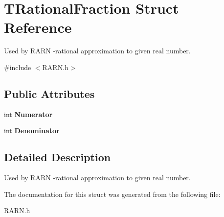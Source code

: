 \hypertarget{struct_t_rational_fraction}{\section{T\+Rational\+Fraction Struct Reference}
\label{struct_t_rational_fraction}
}


Used by R\+A\+R\+N -\/rational approximation to given real number.  




{\ttfamily \#include $<$R\+A\+R\+N.\+h$>$}

\subsection*{Public Attributes}
\begin{DoxyCompactItemize}
\item 
\hypertarget{struct_t_rational_fraction_a786ee34180c2c499b366dd96012dce59}{int {\bfseries Numerator}}\label{struct_t_rational_fraction_a786ee34180c2c499b366dd96012dce59}

\item 
\hypertarget{struct_t_rational_fraction_aa4a827775f6547a4e6c40e4b4eb663f3}{int {\bfseries Denominator}}\label{struct_t_rational_fraction_aa4a827775f6547a4e6c40e4b4eb663f3}

\end{DoxyCompactItemize}


\subsection{Detailed Description}
Used by R\+A\+R\+N -\/rational approximation to given real number. 

The documentation for this struct was generated from the following file\+:\begin{DoxyCompactItemize}
\item 
R\+A\+R\+N.\+h\end{DoxyCompactItemize}
